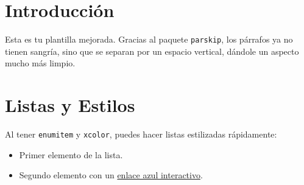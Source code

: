 \documentclass[11pt,a4paper]{article}
\begin{document}
\section*{Introducción}
Esta es tu plantilla mejorada. Gracias al paquete \texttt{parskip}, los párrafos ya no tienen sangría, sino que se separan por un espacio vertical, dándole un aspecto mucho más limpio.

\section*{Listas y Estilos}
Al tener \texttt{enumitem} y \texttt{xcolor}, puedes hacer listas estilizadas rápidamente:
\begin{itemize}[leftmargin=*]
    \item Primer elemento de la lista.
    \item Segundo elemento con un \href{https://es.wikipedia.org}{enlace azul interactivo}.
\end{itemize}
\end{document}
